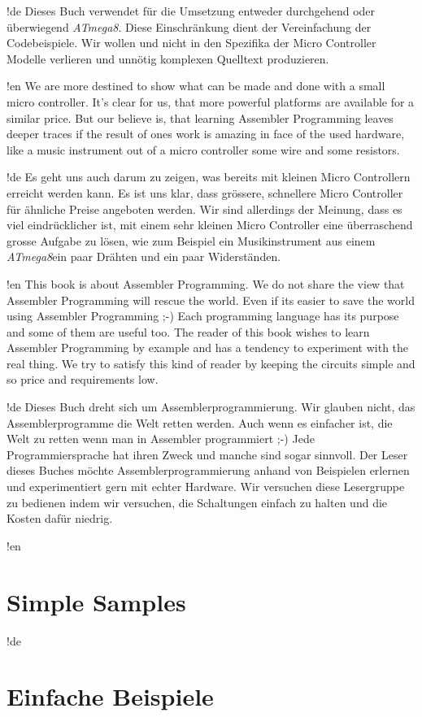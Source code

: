 \documentclass[twoside,12pt,authoryear,openright,a4paper]{book}
\newcommand{\at}{\textit{ATmega8}}
\begin{document}
!de Dieses Buch verwendet für die Umsetzung entweder durchgehend oder überwiegend \at. Diese Einschränkung dient der Vereinfachung der Codebeispiele. Wir wollen und nicht in den Spezifika der Micro Controller Modelle verlieren und unnötig komplexen Quelltext produzieren.



!en We are more destined to show what can be made and done with a small micro controller. It's clear for us, that more powerful platforms are available for a similar price. But our believe is, that learning Assembler Programming leaves deeper traces if the result of ones work is amazing in face of the used hardware, like a music instrument out of a micro controller some wire and some resistors.

!de Es geht uns auch darum zu zeigen, was bereits mit kleinen Micro Controllern erreicht werden kann. Es ist uns klar, dass grössere, schnellere Micro Controller für ähnliche Preise angeboten werden. Wir sind allerdings der Meinung, dass es viel eindrücklicher ist, mit einem sehr kleinen Micro Controller eine überraschend grosse Aufgabe zu lösen, wie zum Beispiel ein Musikinstrument aus einem \at ein paar Drähten und ein paar Widerständen.



!en This book is about Assembler Programming. We do not share the view that Assembler Programming will rescue the world. Even if its easier to save the world using Assembler Programming ;-) Each programming language has its purpose and some of them are useful too. The reader of this book wishes to learn Assembler Programming by example and has a tendency to experiment with the real thing. We try to satisfy this kind of reader by keeping the circuits simple and so price and requirements low.

!de Dieses Buch dreht sich um Assemblerprogrammierung. Wir glauben nicht, das Assemblerprogramme die Welt retten werden. Auch wenn es einfacher ist, die Welt zu retten wenn man in Assembler programmiert ;-) Jede Programmiersprache hat ihren Zweck und manche sind sogar sinnvoll. Der Leser dieses Buches möchte Assemblerprogrammierung anhand von Beispielen erlernen und experimentiert gern mit echter Hardware. Wir versuchen diese Lesergruppe zu bedienen indem wir versuchen, die Schaltungen einfach zu halten und die Kosten dafür niedrig.

\tableofcontents{}
\listoffigures{}
\listoftables{}

!en \part{Simple Samples}
!de \part{Einfache Beispiele}
\end{document}

